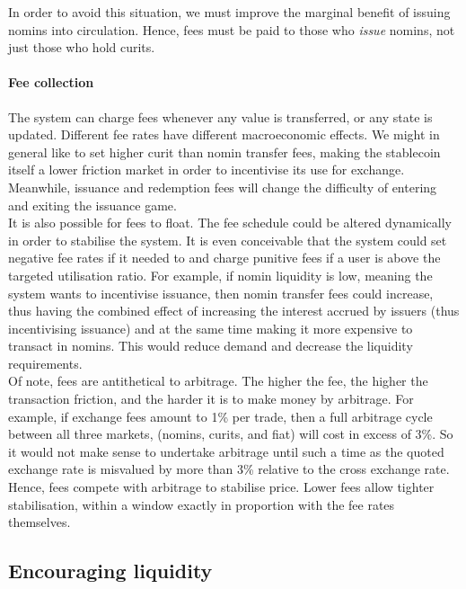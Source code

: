 \noindent In order to avoid this situation, we must improve the marginal benefit of issuing nomins into circulation.
Hence, fees must be paid to those who \textit{issue} nomins, not just those who hold curits.

\paragraph{Fee collection}

The system can charge fees whenever any value is transferred, or any state is updated.
\noindent Different fee rates have different macroeconomic effects. We might in general like to set higher curit than nomin transfer fees, making the stablecoin itself a lower friction market in order to incentivise its use for exchange. Meanwhile, issuance and redemption fees will change the difficulty of entering and exiting the issuance game. \\

\noindent It is also possible for fees to float. The fee schedule could be altered dynamically in order to stabilise the system. It is even conceivable that the system could set negative fee rates if it needed to and charge punitive fees if a user is above the targeted utilisation ratio. For example, if nomin liquidity is low, meaning the system wants to incentivise issuance, then nomin transfer fees could increase, thus having the combined effect of increasing the interest accrued by issuers (thus incentivising issuance) and at the same time making it more expensive to transact in nomins. This would reduce demand and decrease the liquidity requirements. \\

\noindent Of note, fees are antithetical to arbitrage. The higher the fee, the higher the transaction friction, and the harder it is to make money by arbitrage. For example, if exchange fees amount to 1\% per trade, then a full arbitrage cycle between all three markets, (nomins, curits, and fiat) will cost in excess of 3\%. So it would not make sense to undertake arbitrage until such a time as the quoted exchange rate is misvalued by more than 3\% relative to the cross exchange rate. Hence, fees compete with arbitrage to stabilise price. Lower fees allow tighter stabilisation, within a window exactly in proportion with the fee rates themselves.

\subsection{Encouraging liquidity}

